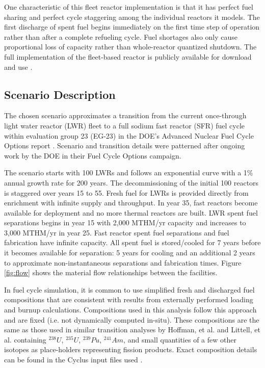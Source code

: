 \documentclass{style}
\begin{document}
One characteristic of this fleet reactor implementation is that it has perfect
fuel sharing and perfect cycle staggering among the individual reactors it
models.  The first discharge of spent fuel begins immediately on
the first time step of operation rather than after a complete refueling cycle.
Fuel shortages also only cause proportional loss of capacity rather than
whole-reactor quantized shutdown.  The full implementation of the fleet-based
reactor is publicly available for download and use \cite{Carlsen2015}.

\subsection{Scenario Description}

The chosen scenario approximates a transition from the current once-through light water
reactor (LWR) fleet to a full sodium fast reactor (SFR) fuel cycle within evaluation group 23 (EG-23)
in the DOE's Advanced Nuclear Fuel Cycle Options report
\cite{wigeland_nuclear_2014}. Scenario and transition details were patterned
after ongoing work by the DOE in their Fuel Cycle Options campaign.


The scenario starts with 100 LWRs and follows an exponential curve with a 1\%
annual growth rate for 200 years.  The decommissioning of the initial 100
reactors is staggered over years 15 to 55.  Fresh fuel for LWRs is provided directly from enrichment with infinite supply and throughput. In year 35, fast reactors become available for
deployment and no more thermal reactors are built.  LWR spent fuel separations
begins in year 15 with 2,000 MTHM/yr capacity and increases to 3,000 MTHM/yr in
year 25.  Fast reactor spent fuel separations and fuel fabrication have
infinite capacity.  All spent fuel is stored/cooled for 7 years before it becomes
available for separation: 5 years for cooling and an additional 2 years to approximate non-instantaneous separations and fabrication times. Figure \ref{fig:flow} shows the material flow
relationships between the facilities.

In fuel cycle simulation, it is common to use simplified fresh and discharged
fuel compositions that are consistent with results from externally performed
loading and burnup calculations. Compositions used in this analysis follow
this approach and are fixed (i.e. not dynamically computed in-situ).  These
compositions are the same as those used in similar transition analyses by
Hoffman, et al. \cite{hoffman-eg23-2016} and Littell, et al.
\cite{littell-cyclus-2015} containing $^{238}U$, $^{235}U$, $^{239}Pu$,
$^{241}Am$, and small quantities of a few other isotopes as place-holders
representing fission products. Exact composition details can be found in the
Cyclus input files used \cite{Carlsen2015}.
\end{document}
